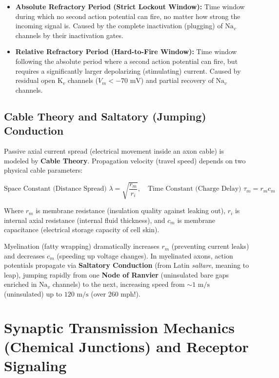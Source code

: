 \documentclass[10pt,journal,compsoc,onecolumn]{IEEEtran}
\begin{document}
\begin{itemize}
    \item \textbf{Absolute Refractory Period (Strict Lockout Window):} Time window during which no second action potential can fire, no matter how strong the incoming signal is. Caused by the complete inactivation (plugging) of $\text{Na}_v$ channels by their inactivation gates.
    \item \textbf{Relative Refractory Period (Hard-to-Fire Window):} Time window following the absolute period where a second action potential can fire, but requires a significantly larger depolarizing (stimulating) current. Caused by residual open $\text{K}_v$ channels ($V_m < -70\text{ mV}$) and partial recovery of $\text{Na}_v$ channels.
\end{itemize}

\subsection{Cable Theory and Saltatory (Jumping) Conduction}

Passive axial current spread (electrical movement inside an axon cable) is modeled by \textbf{Cable Theory}. Propagation velocity (travel speed) depends on two physical cable parameters:

\begin{equation}
\text{Space Constant (Distance Spread) } \lambda = \sqrt{\frac{r_m}{r_i}}, \quad \text{Time Constant (Charge Delay) } \tau_m = r_m c_m
\end{equation}

Where $r_m$ is membrane resistance (insulation quality against leaking out), $r_i$ is internal axial resistance (internal fluid thickness), and $c_m$ is membrane capacitance (electrical storage capacity of cell skin).

Myelination (fatty wrapping) dramatically increases $r_m$ (preventing current leaks) and decreases $c_m$ (speeding up voltage changes). In myelinated axons, action potentials propagate via \textbf{Saltatory Conduction} (from Latin \emph{saltare}, meaning to leap), jumping rapidly from one \textbf{Node of Ranvier} (uninsulated bare gaps enriched in $\text{Na}_v$ channels) to the next, increasing speed from $\sim 1\text{ m/s}$ (uninsulated) up to $120\text{ m/s}$ (over 260 mph!).

\section{Synaptic Transmission Mechanics (Chemical Junctions) and Receptor Signaling}
\label{sec:synaptic_transmission}
\end{document}

